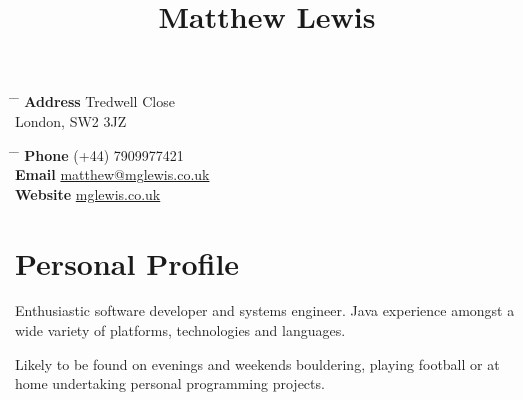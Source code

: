 \documentclass[10pt]{article} %
\begin{document}

\title{Matthew Lewis} %


\parbox{0.5\textwidth}{ %
\begin{tabbing} %
\hspace{3cm} \= \hspace{4cm} \= \kill %
{\bf Address}  Tredwell Close \\
\> London, SW2 3JZ \\
\end{tabbing}}
\hfill %
\parbox{0.5\textwidth}{ %
\begin{tabbing} %
\hspace{3cm} \= \hspace{4cm} \= \kill %
{\bf Phone} \> (+44) 7909977421 \\ %
{\bf Email} \> \href{mailto:matthew@mglewis.co.uk}{matthew@mglewis.co.uk} \\ %
{\bf Website} \> \href{http://www.mglewis.co.uk}{mglewis.co.uk}
\end{tabbing}}



\section{Personal Profile}

Enthusiastic software developer and systems engineer. Java experience amongst a wide variety of platforms, technologies and languages.

Likely to be found on evenings and weekends bouldering, playing football or at home undertaking personal programming projects.

\end{document}

